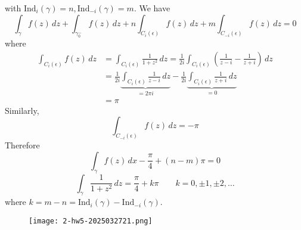 with $\mathrm{Ind}_{i}(\gamma)=n,\mathrm{Ind}_{-i}(\gamma)=m$. We have
\[
\int_{\gamma}^{} f(z) \, dz +\int_{\gamma_0^{-}}^{} f(z) \, dz +n\int_{C_{i}(\epsilon)}^{} f(z) \, dz+m\int_{C_{-i}(\epsilon)}^{} f(z) \, dz  =0
\]
where
\[
\begin{aligned}
\int_{C_i(\epsilon)}^{} f(z) \, dz & =\int_{C_i(\epsilon)}^{} \frac{1}{1+z^2}  \, dz=\frac{1}{2i} \int_{C_i(\epsilon)}^{} \left( \frac{1}{z-i} -\frac{1}{z+i} \right) \, dz \\
 & =\frac{1}{2i }\underbrace{ \int_{C_i(\epsilon)}^{} \frac{1}{z-i}  \, dz }_{ =2\pi i }-\frac{1}{2i} \underbrace{ \int_{C_i(\epsilon)}^{} \frac{1}{z+i}  \, dz }_{ =0 }    \\
 & =\pi
\end{aligned}
\]
Similarly,
\[
\int_{C_{-i}(\epsilon)}^{} f(z) \, dz =-\pi
\]
Therefore
\[
\int_{\gamma}^{} f(z) \, dx -\frac{\pi}{4}+(n-m)\pi=0
\]
\[
\int_{\gamma}^{} \frac{1}{1+z^2}  \, dz=\frac{\pi}{4}+k\pi \qquad k=0,\pm1,\pm2,\dots
\]
where $k=m-n=\mathrm{Ind}_{i}(\gamma)-\mathrm{Ind}_{-i}(\gamma)$.

\begin{figure}[H]
\centering
\texttt{[image: 2-hw5-2025032721.png]}
\label{}
\end{figure}

